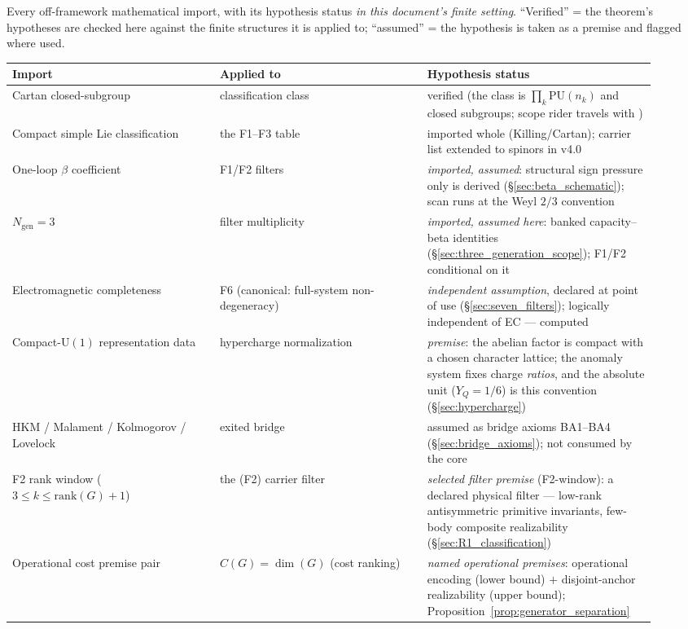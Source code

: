 \documentclass[11pt]{article}
\theoremstyle{definition}
\newcommand{\U}{\mathrm{U}}
\newcommand{\codeid}[1]{\texttt{\seqsplit{#1}}}%
\begin{document}
\begin{tcolorbox}[apfbox, title={Imported-ingredient hypothesis ledger (verified vs.\ assumed in the finite-cost environment)}]
\footnotesize
Every off-framework mathematical import, with its hypothesis status
\emph{in this document's finite setting}.  ``Verified'' = the theorem's
hypotheses are checked here against the finite structures it is applied
to; ``assumed'' = the hypothesis is taken as a premise and flagged where
used.

\smallskip
\begin{tabular}{@{}p{0.30\linewidth}p{0.30\linewidth}p{0.32\linewidth}@{}}
\toprule
\textbf{Import} & \textbf{Applied to} & \textbf{Hypothesis status} \\
\midrule
Cartan closed-subgroup & classification class & verified (the class is $\prod_k \mathrm{PU}(n_k)$ and closed subgroups; scope rider travels with \codeid{check\_L\_cost\_gauge}) \\
Compact simple Lie classification & the F1--F3 table & imported whole (Killing/Cartan); carrier list extended to spinors in v4.0 \\
One-loop $\beta$ coefficient & F1/F2 filters & \emph{imported, assumed}: structural sign pressure only is derived (\S\ref{sec:beta_schematic}); scan runs at the Weyl $2/3$ convention \\
$N_{\mathrm{gen}} = 3$ & filter multiplicity & \emph{imported, assumed here}: banked capacity--beta identities (\S\ref{sec:three_generation_scope}); F1/F2 conditional on it \\
Electromagnetic completeness & F6 (canonical: full-system non-degeneracy) & \emph{independent assumption}, declared at point of use (\S\ref{sec:seven_filters}); logically independent of EC --- computed \\
Compact-$\U(1)$ representation data & hypercharge normalization & \emph{premise}: the abelian factor is compact with a chosen character lattice; the anomaly system fixes charge \emph{ratios}, and the absolute unit ($Y_Q = 1/6$) is this convention (\S\ref{sec:hypercharge}) \\
HKM / Malament / Kolmogorov / Lovelock & exited bridge & assumed as bridge axioms BA1--BA4 (\S\ref{sec:bridge_axioms}); not consumed by the core \\
F2 rank window ($3 \le k \le \mathrm{rank}(G){+}1$) & the (F2) carrier filter & \emph{selected filter premise} (F2-window): a declared physical filter --- low-rank antisymmetric primitive invariants, few-body composite realizability (\S\ref{sec:R1_classification}) \\
Operational cost premise pair & $C(G) = \dim(G)$ (cost ranking) & \emph{named operational premises}: operational encoding (lower bound) $+$ disjoint-anchor realizability (upper bound); Proposition~\ref{prop:generator_separation} \\
\bottomrule
\end{tabular}
\end{tcolorbox}
\end{document}
